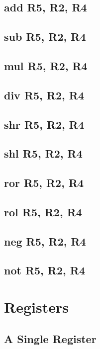 \documentclass{article}
\begin{document}
    \subsection{add R5, R2, R4}
    \subsection{sub R5, R2, R4}
    \subsection{mul R5, R2, R4}
    \subsection{div R5, R2, R4}
    \subsection{shr R5, R2, R4}
    \subsection{shl R5, R2, R4}
    \subsection{ror R5, R2, R4}
    \subsection{rol R5, R2, R4}
    \subsection{neg R5, R2, R4}
    \subsection{not R5, R2, R4}

\appendix
% 
\section{Registers} \label{A}
    \subsection{A Single Register} \label{A.1}
        
\end{document}
